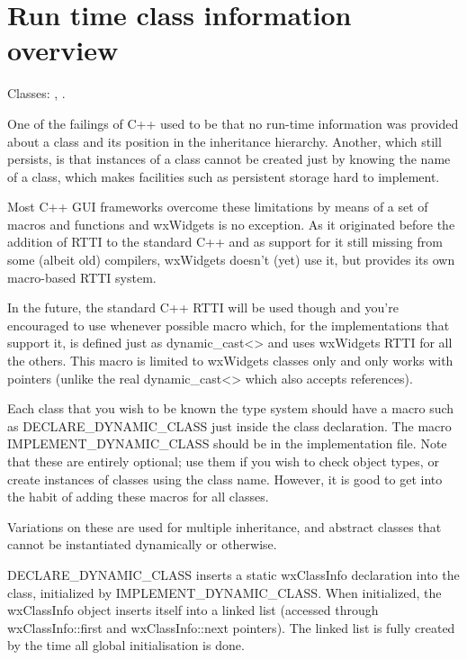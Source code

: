 \section{Run time class information overview}\label{runtimeclassoverview}

Classes: , .

One of the failings of C++ used to be that no run-time information was provided
about a class and its position in the inheritance hierarchy.
Another, which still persists, is that instances of a class cannot be created
just by knowing the name of a class, which makes facilities such as persistent
storage hard to implement.

Most C++ GUI frameworks overcome these limitations by means of a set of
macros and functions and wxWidgets is no exception. As it originated before the
addition of RTTI to the standard C++ and as support for it still missing from
some (albeit old) compilers, wxWidgets doesn't (yet) use it, but provides its
own macro-based RTTI system.

In the future, the standard C++ RTTI will be used though and you're encouraged
to use whenever possible  macro which,
for the implementations that support it, is defined just as dynamic\_cast<> and
uses wxWidgets RTTI for all the others. This macro is limited to wxWidgets
classes only and only works with pointers (unlike the real dynamic\_cast<> which
also accepts references).

Each class that you wish to be known the type system should have
a macro such as DECLARE\_DYNAMIC\_CLASS just inside the class declaration.
The macro IMPLEMENT\_DYNAMIC\_CLASS should be in the implementation file.
Note that these are entirely optional; use them if you wish to check object
types, or create instances of classes using the class name. However,
it is good to get into the habit of adding these macros for all classes.

Variations on these  are used for multiple inheritance, and abstract
classes that cannot be instantiated dynamically or otherwise.

DECLARE\_DYNAMIC\_CLASS inserts a static wxClassInfo declaration into the
class, initialized by IMPLEMENT\_DYNAMIC\_CLASS. When initialized, the
wxClassInfo object inserts itself into a linked list (accessed through
wxClassInfo::first and wxClassInfo::next pointers). The linked list
is fully created by the time all global initialisation is done.

